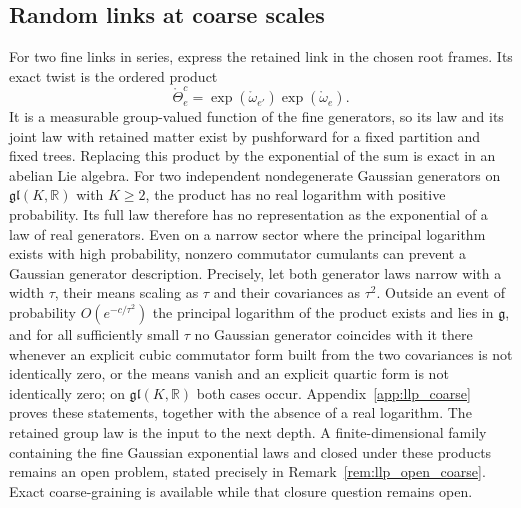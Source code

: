 \subsection{Random links at coarse scales}
For two fine links in series, express the retained link in the chosen root frames. Its exact twist is the ordered product
\begin{equation}
\boxed{\mathring\Theta_e^c
=\exp(\mathring\omega_{e'})\exp(\mathring\omega_e).}
\label{eq:pifb_coarse_link_product}
\end{equation}
It is a measurable group-valued function of the fine generators, so its law and its joint law with retained matter exist by pushforward for a fixed partition and fixed trees. Replacing this product by the exponential of the sum is exact in an abelian Lie algebra. For two independent nondegenerate Gaussian generators on $\mathfrak{gl}(K,\mathbb R)$ with $K\geq2$, the product has no real logarithm with positive probability. Its full law therefore has no representation as the exponential of a law of real generators. Even on a narrow sector where the principal logarithm exists with high probability, nonzero commutator cumulants can prevent a Gaussian generator description. Precisely, let both generator laws narrow with a width $\tau$, their means scaling as $\tau$ and their covariances as $\tau^2$. Outside an event of probability $O(e^{-c/\tau^2})$ the principal logarithm of the product exists and lies in $\mathfrak g$, and for all sufficiently small $\tau$ no Gaussian generator coincides with it there whenever an explicit cubic commutator form built from the two covariances is not identically zero, or the means vanish and an explicit quartic form is not identically zero; on $\mathfrak{gl}(K,\mathbb R)$ both cases occur. Appendix~\ref{app:llp_coarse} proves these statements, together with the absence of a real logarithm. The retained group law is the input to the next depth. A finite-dimensional family containing the fine Gaussian exponential laws and closed under these products remains an open problem, stated precisely in Remark~\ref{rem:llp_open_coarse}. Exact coarse-graining is available while that closure question remains open.

